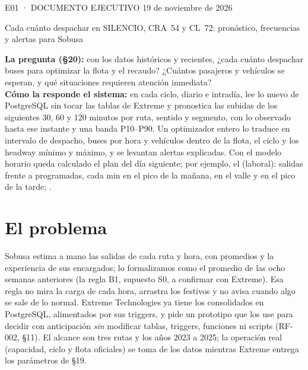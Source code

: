 \documentclass[10pt,a4paper]{article}
\begin{document}
\thispagestyle{fancy}
{\footnotesize\color{rol-tinta-3}E01 · DOCUMENTO EJECUTIVO \hfill 19 de noviembre de 2026}\par\vspace{2pt}
{\interligera\fontsize{19}{22}\selectfont{} Cada cuánto despachar en
SILENCIO, CRA~54 y CL~72: pronóstico, frecuencias y alertas para Sobusa\par}
\vspace{3pt}
{\small{}\par}
\vspace{4pt}

\begin{respuesta}
\small\textbf{La pregunta (§20):} con los datos históricos y recientes, ¿cada cuánto despachar buses para optimizar la
flota y el recaudo? ¿Cuántos pasajeros y vehículos se esperan, y qué situaciones requieren atención inmediata?\\[2pt]
\textbf{Cómo la responde el sistema:} en cada ciclo, diario e intradía, lee lo nuevo de PostgreSQL sin tocar las tablas
de Extreme y pronostica las subidas de los siguientes 30, 60 y 120 minutos por ruta, sentido y segmento, con lo
observado hasta ese instante y una banda P10–P90. Un optimizador entero lo traduce en intervalo de despacho, buses por
hora y vehículos dentro de la flota, el ciclo y los headway mínimo y máximo, y se levantan alertas explicadas. Con el
modelo horario queda calculado el plan del día siguiente; por ejemplo, \RespEjRuta{} el \RespuestaFecha{} (laboral): \RespEjSalidas{} salidas frente a \RespEjProgramadas{} programadas, cada
\RespEjPicoManana{} min en el pico de la mañana, \RespEjValle{} en el valle y \RespEjPicoTarde{} en el pico de la
tarde; \RespEjNoViables.
\end{respuesta}

\section{El problema}
Sobusa estima a mano las salidas de cada ruta y hora, con promedios y la experiencia de sus encargados; lo
formalizamos como el promedio de las ocho semanas anteriores (la regla B1, supuesto S0, a confirmar con Extreme). Esa
regla no mira la carga de cada hora, arrastra los festivos y no avisa cuando algo se sale de lo normal. Extreme Technologies ya
tiene los consolidados en PostgreSQL, alimentados por sus triggers, y pide un prototipo que los use para decidir con
anticipación \emph{sin} modificar tablas, triggers, funciones ni scripts (RF-002, §11). El alcance son tres rutas y los
años 2023 a 2025; la operación real (capacidad, ciclo y flota oficiales) se toma de los datos mientras Extreme entrega
los parámetros de §19.
\end{document}
